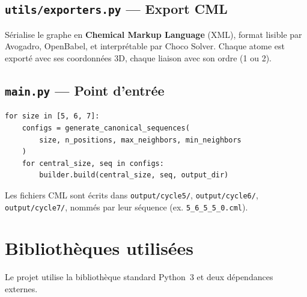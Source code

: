 \documentclass[a4paper,12pt]{article}
\begin{document}
\subsection{\texttt{utils/exporters.py} — Export CML}

Sérialise le graphe en \textbf{Chemical Markup Language} (XML), format lisible par Avogadro,
OpenBabel, et interprétable par Choco Solver. Chaque atome est exporté avec ses coordonnées 3D,
chaque liaison avec son ordre (1 ou 2).

\subsection{\texttt{main.py} — Point d'entrée}

\begin{lstlisting}
for size in [5, 6, 7]:
    configs = generate_canonical_sequences(
        size, n_positions, max_neighbors, min_neighbors
    )
    for central_size, seq in configs:
        builder.build(central_size, seq, output_dir)
\end{lstlisting}

Les fichiers CML sont écrits dans \texttt{output/cycle5/}, \texttt{output/cycle6/},
\texttt{output/cycle7/}, nommés par leur séquence (ex. \texttt{5\_6\_5\_5\_0.cml}).

\section{Bibliothèques utilisées}

Le projet utilise la bibliothèque standard Python~3 et deux dépendances externes.
\end{document}
